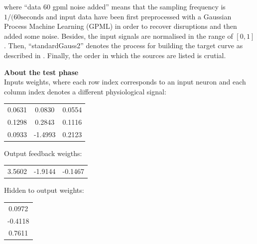 \begin{description}
{where ``data 60 gpml noise  added'' means that the sampling frequency is $1/(60 \text{seconds}$ and input data have been first preprocessed with a Gaussian Process Machine Learning (GPML) in order to recover disruptions \cite{Rasmussen06gaussianprocesses} and then added some noise.
Besides, the input signals are normalised in the range of $[0,1]$. Then, ``standardGauss2'' denotes the process for building the target curve as described in . Finally, the order in which the sources are listed is crutial. 
}

\item {\textbf{About the test phase}\hfill \\
Inputs weights, where each row index corresponds to an input neuron and each column index denotes a different physiological signal:\\
\begin{center}
\begin{tabular}{ c c c }
    0.0631   & 0.0830   & 0.0554 \\
    0.1298   & 0.2843   & 0.1116 \\
    0.0933   &-1.4993   & 0.2123
\end{tabular}
\end{center}

Output feedback weigths:
\begin{center}
\begin{tabular}{ c c c }
	3.5602  & -1.9144   &-0.1467
\end{tabular}
\end{center}
}

Hidden to output weights:
\begin{center}
\begin{tabular}{ c }
0.0972\\
   -0.4118\\
    0.7611
    \end{tabular}
\end{center}

\end{description}






